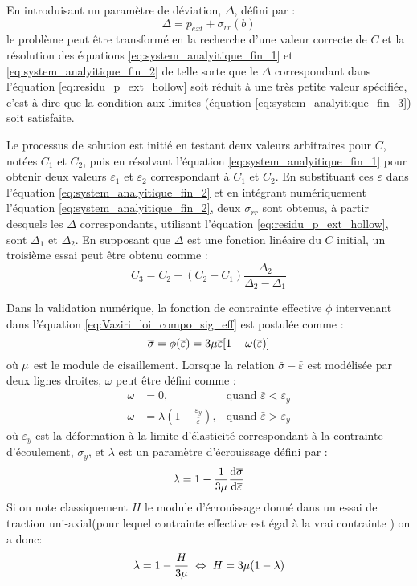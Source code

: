 \documentclass[10pt]{book}
\begin{document}
En introduisant un paramètre de déviation, $\Delta$, défini par :
\begin{equation}
\Delta = p_{ext} + \sigma_{rr}(b)
\label{eq:residu_p_ext_hollow}
\end{equation}
le problème peut être transformé en la recherche d'une valeur correcte de $C$ et la résolution des équations \eqref{eq:system_analyitique_fin_1} et \eqref{eq:system_analyitique_fin_2} de telle sorte que le $\Delta$ correspondant dans l'équation \eqref{eq:residu_p_ext_hollow} soit réduit à une très petite valeur spécifiée, c'est-à-dire que la condition aux limites (équation \eqref{eq:system_analyitique_fin_3}) soit satisfaite.

Le processus de solution est initié en testant deux valeurs arbitraires pour $C$, notées $C_1$ et $C_2$, puis en résolvant l'équation \eqref{eq:system_analyitique_fin_1} pour obtenir deux valeurs $\bar{\varepsilon}_{1}$ et $\bar{\varepsilon}_{2}$ correspondant à $C_1$ et $C_2$. En substituant ces $\bar{\varepsilon}$ dans l'équation \eqref{eq:system_analyitique_fin_2} et en intégrant numériquement l'équation \eqref{eq:system_analyitique_fin_2}, deux $\sigma_{rr}$ sont obtenus, à partir desquels les $\Delta$ correspondants, utilisant l'équation \eqref{eq:residu_p_ext_hollow}, sont $\Delta_1$ et $\Delta_2$. En supposant que $\Delta$ est une fonction linéaire du $C$ initial, un troisième essai peut être obtenu comme :
$$C_3 = C_2 - (C_2 - C_1)\frac{\Delta_2}{\Delta_2 - \Delta_1}$$

Dans la validation numérique, la fonction de contrainte effective $\phi$ intervenant dans l'équation \eqref{eq:Vaziri_loi_compo_sig_eff} est postulée comme :
$$\overline{\sigma} =\phi(\overline{\varepsilon})=3\mu\overline{\varepsilon}[1 - \omega(\overline{\varepsilon})]$$
où $\mu$ est le module de cisaillement. Lorsque la relation $\bar{\sigma} - \bar{\varepsilon}$ est modélisée par deux lignes droites, $\omega$ peut être défini comme :
\begin{align*}
\omega &= 0, & \text{quand } \bar{\varepsilon} < \varepsilon_y\\
\omega &= \lambda\left(1 - \frac{\varepsilon_y}{\bar{\varepsilon}}\right), & \text{quand } \bar{\varepsilon} > \varepsilon_y
\end{align*}
où $\varepsilon_y$ est la déformation à la limite d'élasticité correspondant à la contrainte d'écoulement, $\sigma_y$, et $\lambda$ est un paramètre d'écrouissage défini par :
$$\lambda = 1 - \frac{1}{3\mu}\frac{\mathrm{d}\overline{\sigma}}{\mathrm{d}\overline{\varepsilon}}$$
Si on note classiquement $H$ le module d'écrouissage donné dans un essai de traction uni-axial(pour lequel contrainte effective est égal à la \og vrai contrainte \fg{}) on a donc:
$$\lambda = 1- \frac{H}{3\mu}\; \Leftrightarrow \; H = 3\mu(1-\lambda)$$
\end{document}
